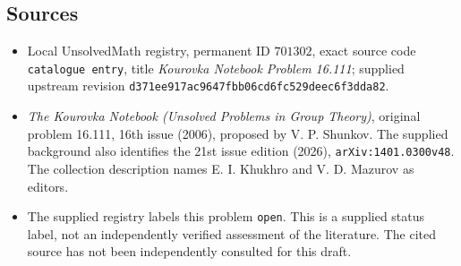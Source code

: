 \documentclass[11pt]{article}
\begin{document}
\subsection{Sources}
\begin{itemize}
\item Local UnsolvedMath registry, permanent ID \(701302\), exact source code \texttt{catalogue entry}, title \emph{Kourovka Notebook Problem 16.111}; supplied upstream revision \texttt{d371ee917ac9647fbb06cd6fc529deec6f3dda82}.
\item \emph{The Kourovka Notebook (Unsolved Problems in Group Theory)}, original problem 16.111, 16th issue (2006), proposed by V. P. Shunkov. The supplied background also identifies the 21st issue edition (2026), \texttt{arXiv:1401.0300v48}. The collection description names E. I. Khukhro and V. D. Mazurov as editors.
\item The supplied registry labels this problem \texttt{open}. This is a supplied status label, not an independently verified assessment of the literature. The cited source has not been independently consulted for this draft.
\end{itemize}
\end{document}
